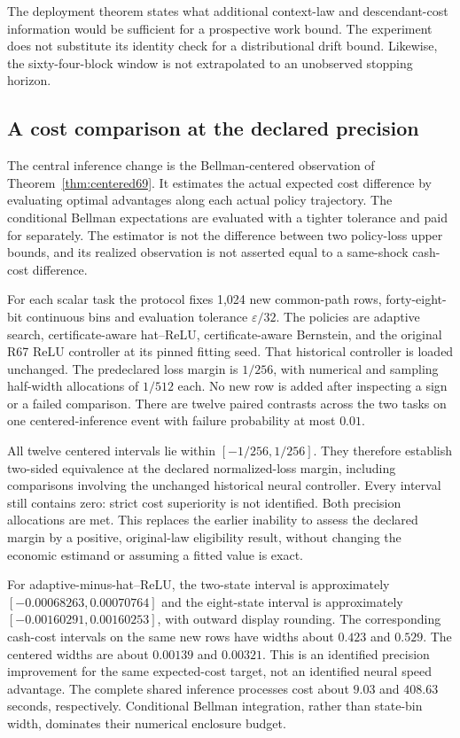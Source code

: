 The deployment theorem states what additional context-law and descendant-cost information would be sufficient for a prospective work bound. The experiment does not substitute its identity check for a distributional drift bound. Likewise, the sixty-four-block window is not extrapolated to an unobserved stopping horizon.

\subsection{A cost comparison at the declared precision}
The central inference change is the Bellman-centered observation of Theorem~\ref{thm:centered69}. It estimates the actual expected cost difference by evaluating optimal advantages along each actual policy trajectory. The conditional Bellman expectations are evaluated with a tighter tolerance and paid for separately. The estimator is not the difference between two policy-loss upper bounds, and its realized observation is not asserted equal to a same-shock cash-cost difference.

For each scalar task the protocol fixes 1,024 new common-path rows, forty-eight-bit continuous bins and evaluation tolerance $\varepsilon/32$. The policies are adaptive search, certificate-aware hat--ReLU, certificate-aware Bernstein, and the original R67 ReLU controller at its pinned fitting seed. That historical controller is loaded unchanged. The predeclared loss margin is $1/256$, with numerical and sampling half-width allocations of $1/512$ each. No new row is added after inspecting a sign or a failed comparison. There are twelve paired contrasts across the two tasks on one centered-inference event with failure probability at most $0.01$.



All twelve centered intervals lie within $[-1/256,1/256]$. They therefore establish two-sided equivalence at the declared normalized-loss margin, including comparisons involving the unchanged historical neural controller. Every interval still contains zero: strict cost superiority is not identified. Both precision allocations are met. This replaces the earlier inability to assess the declared margin by a positive, original-law eligibility result, without changing the economic estimand or assuming a fitted value is exact.

For adaptive-minus-hat--ReLU, the two-state interval is approximately $[-0.00068263,0.00070764]$ and the eight-state interval is approximately $[-0.00160291,0.00160253]$, with outward display rounding. The corresponding cash-cost intervals on the same new rows have widths about $0.423$ and $0.529$. The centered widths are about $0.00139$ and $0.00321$. This is an identified precision improvement for the same expected-cost target, not an identified neural speed advantage. The complete shared inference processes cost about $9.03$ and $408.63$ seconds, respectively. Conditional Bellman integration, rather than state-bin width, dominates their numerical enclosure budget.

